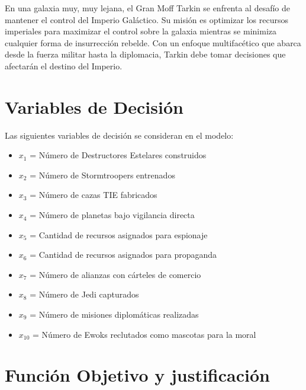 \documentclass[
	spanish, %
	oneside
]{article}
\begin{document}
En una galaxia muy, muy lejana, el Gran Moff Tarkin se enfrenta al desafío de mantener el control del Imperio Galáctico. Su misión es optimizar los recursos imperiales para maximizar el control sobre la galaxia mientras se minimiza cualquier forma de insurrección rebelde. Con un enfoque multifacético que abarca desde la fuerza militar hasta la diplomacia, Tarkin debe tomar decisiones que afectarán el destino del Imperio.


\section{Variables de Decisión}



Las siguientes variables de decisión se consideran en el modelo:



\begin{itemize}

    \item \( x_1 \) = Número de Destructores Estelares construidos

    \item \( x_2 \) = Número de Stormtroopers entrenados

    \item \( x_3 \) = Número de cazas TIE fabricados

    \item \( x_4 \) = Número de planetas bajo vigilancia directa

    \item \( x_5 \) = Cantidad de recursos asignados para espionaje

    \item \( x_6 \) = Cantidad de recursos asignados para propaganda

    \item \( x_7 \) = Número de alianzas con cárteles de comercio

    \item \( x_8 \) = Número de Jedi capturados

    \item \( x_9 \) = Número de misiones diplomáticas realizadas

    \item \( x_{10} \) = Número de Ewoks reclutados como mascotas para la moral

\end{itemize}

\newpage

\section{Función Objetivo y justificación}
 \newblock
\end{document}

